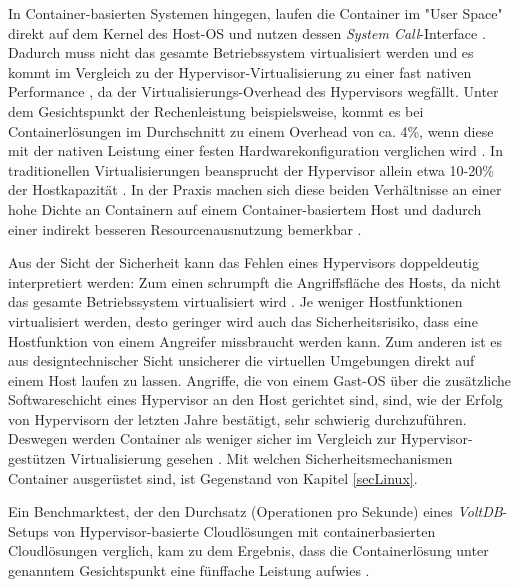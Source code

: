 \documentclass[../main.tex]{subfiles}
\begin{document}
      In Container-basierten Systemen hingegen, laufen die Container im "User Space" direkt auf dem Kernel des Host-\acrshort{OS} und nutzen dessen \emph{System Call}-Interface \cite[S.6+7]{dockerBook}. Dadurch muss nicht das gesamte Betriebssystem virtualisiert werden und es kommt im Vergleich zu der Hypervisor-Virtualisierung zu einer fast nativen Performance \cite[S.1]{containerVirtPerformance}, da der Virtualisierungs-Overhead des Hypervisors wegfällt. Unter dem Gesichtspunkt der Rechenleistung beispielsweise, kommt es bei Containerlösungen im Durchschnitt zu einem Overhead von ca. 4\%, wenn diese mit der nativen Leistung einer festen Hardwarekonfiguration verglichen wird \cite[S.4]{containerVirtPerformance}\cite[S.5]{IBMcontVMcomparison}. In traditionellen Virtualisierungen beansprucht der Hypervisor allein etwa 10-20\% der Hostkapazität \cite[S.2]{dockerIntroIEEE}\cite[S.5]{IBMcontVMcomparison}. In der Praxis machen sich diese beiden Verhältnisse an einer hohe Dichte an Containern auf einem Container-basiertem Host und dadurch einer indirekt besseren Resourcenausnutzung bemerkbar \cite[S.7+8]{dockerBook}.

			Aus der Sicht der Sicherheit kann das Fehlen eines Hypervisors doppeldeutig interpretiert werden: Zum einen schrumpft die Angriffsfläche des Hosts, da nicht das gesamte Betriebssystem virtualisiert wird \cite[S.6]{dockerBook}. Je weniger Hostfunktionen virtualisiert werden, desto geringer wird auch das Sicherheitsrisiko, dass eine Hostfunktion von einem Angreifer missbraucht werden kann. Zum anderen ist es aus designtechnischer Sicht unsicherer die virtuellen Umgebungen direkt auf einem Host laufen zu lassen. Angriffe, die von einem Gast-\acrshort{OS} über die zusätzliche Softwareschicht eines Hypervisor an den Host gerichtet sind, sind, wie der Erfolg von Hypervisorn der letzten Jahre bestätigt, sehr schwierig durchzuführen.
			Deswegen werden Container als weniger sicher im Vergleich zur Hypervisor-gestützen Virtualisierung gesehen \cite[S.6]{dockerBook}. Mit welchen Sicherheitsmechanismen Container ausgerüstet sind, ist Gegenstand von Kapitel \ref{secLinux}.


      Ein Benchmarktest, der den Durchsatz (Operationen pro Sekunde) eines \emph{VoltDB}-Setups\cite{voltdb} von Hypervisor-basierte Cloudlösungen mit containerbasierten \gls{Cloud}lösungen verglich, kam zu dem Ergebnis, dass die Containerlösung unter genanntem Gesichtspunkt eine fünffache Leistung aufwies \cite[S.2+3]{voltdbBenchmark}.
\end{document}
